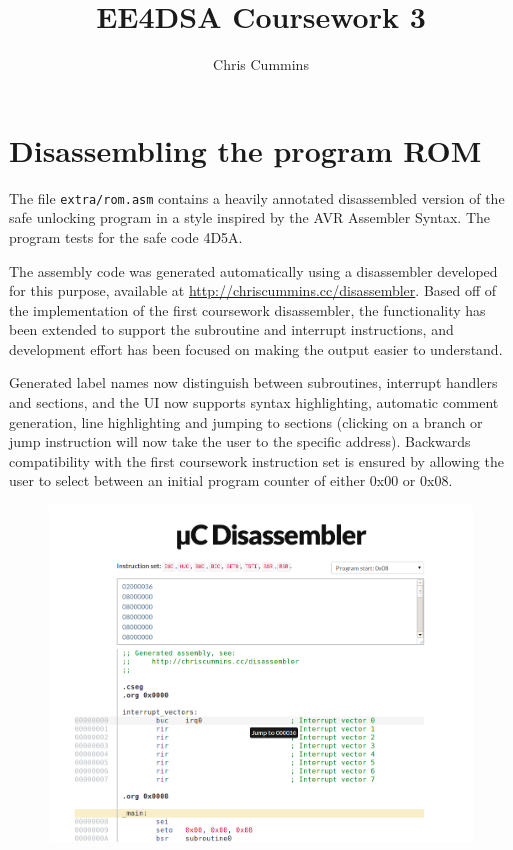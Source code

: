 \documentclass[12pt,a4paper]{article}
\title{EE4DSA Coursework 3}
\author{Chris Cummins}
\begin{document}
\maketitle

\section{Disassembling the program ROM}

The file \texttt{extra/rom.asm} contains a heavily annotated
disassembled version of the safe unlocking program in a style inspired
by the AVR Assembler Syntax. The program tests for the safe code 4D5A.

The assembly code was generated automatically using a disassembler
developed for this purpose, available at
\url{http://chriscummins.cc/disassembler}. Based off of the
implementation of the first coursework disassembler, the functionality
has been extended to support the subroutine and interrupt
instructions, and development effort has been focused on making the
output easier to understand.

Generated label names now distinguish between subroutines, interrupt
handlers and sections, and the UI now supports syntax highlighting,
automatic comment generation, line highlighting and jumping to
sections (clicking on a branch or jump instruction will now take the
user to the specific address). Backwards compatibility with the first
coursework instruction set is ensured by allowing the user to select
between an initial program counter of either 0x00 or 0x08.

\begin{figure}[H]
  \centering
  \includegraphics[width=6.4in]{assets/disassembler.png}
\end{figure}
\end{document}
